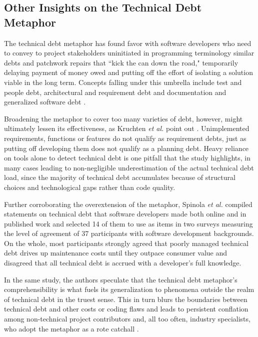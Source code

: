 \subsection{Other Insights on the Technical Debt Metaphor}

The technical debt metaphor has found favor with software developers who need to convey to project stakeholders uninitiated in programming terminology similar debts and patchwork repairs that ``kick the can down the road," temporarily delaying payment of money owed and putting off the effort of isolating a solution viable in the long term. Concepts falling under this umbrella include test and people debt, architectural and requirement debt and documentation and generalized software debt \cite{sterling2010managing}.

Broadening the metaphor to cover too many varieties of debt, however, might ultimately lessen its effectiveness, as Kruchten \textit{et al.} point out \cite{Kruchten_td_IEEE}.  Unimplemented requirements, functions or features do not qualify as requirement debts, just as putting off developing them does not qualify as a planning debt. Heavy reliance on tools alone to detect technical debt is one pitfall that the study highlights, in many cases leading to non-negligible underestimation of the actual technical debt load, since the majority of technical debt accumulates because of structural choices and technological gaps rather than code quality.

Further corroborating the overextension of the metaphor, Spinola \textit{et al.} \cite{spinola2013investigating} compiled statements on technical debt that software developers made both online and in published work and selected 14 of them to use as items in two surveys measuring the level of agreement of 37 participants with software development backgrounds. On the whole, most participants strongly agreed that poorly managed technical debt drives up maintenance costs until they outpace consumer value and disagreed that all technical debt is accrued with a developer's full knowledge.

In the same study, the authors speculate that the technical debt metaphor's comprehensibility is what fuels its generalization to phenomena outside the realm of technical debt in the truest sense. This in turn blurs the boundaries between technical debt and other costs or coding flaws and leads to persistent conflation among non-technical project contributors and, all too often, industry specialists, who adopt the metaphor as a rote catchall \cite{spinola2013investigating}.

